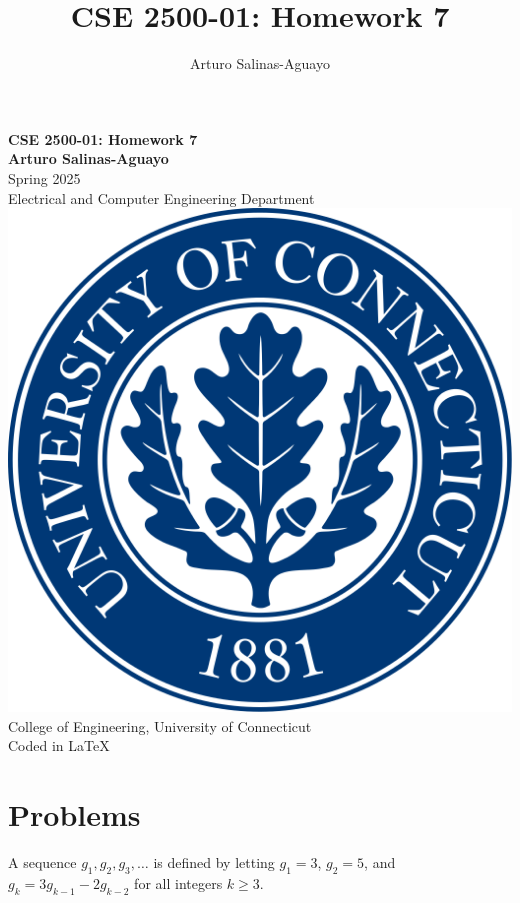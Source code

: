 \documentclass[12pt]{article}
\author{Arturo Salinas-Aguayo}
\title{CSE 2500-01: Homework 7}
\begin{document}
\newcommand{\closure}[2][3]{%
	{}\mkern#1mu\overline{\mkern-#1mu#2}}
\newcommand\ncoverline[1]{\mkern1mu\overline{\mkern-1mu#1\mkern-1mu}\mkern1mu}
\begin{titlepage}
	\centering
	\vspace*{3cm}
	\huge\textbf{CSE 2500-01: Homework 7}\\
	\vspace{5cm}
	\Large\textbf{Arturo Salinas-Aguayo}\\
	\normalsize
	Spring 2025\\
	Electrical and Computer Engineering Department\\
	\vfill
	\includegraphics[scale=0.1]{uconnlogo}\\
	College of Engineering, University of Connecticut\\
	\scriptsize{Coded in \LaTeX}
	\vspace*{1cm}
\end{titlepage}

\section*{Problems}

A sequence $g_1, g_2, g_3, \dots$ is defined by letting $g_1 = 3$, $g_2 = 5$, and $g_k = 3g_{k-1} - 2g_{k-2}$ for all integers $k \geq 3$.
\end{document}
